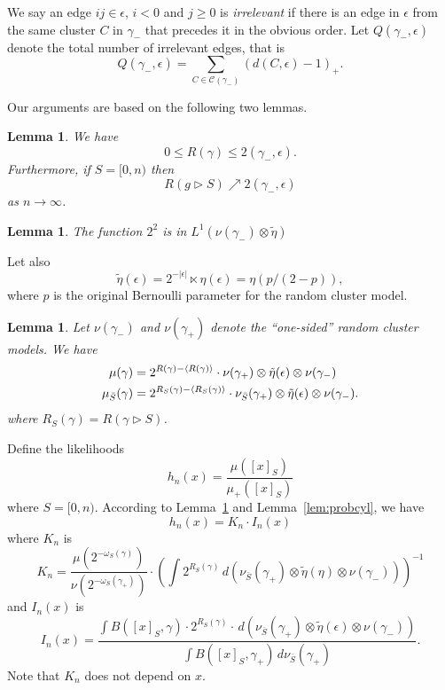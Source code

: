 \documentclass[11pt, a4paper]{amsart}
\newtheorem{lem}[thm]{Lemma}
\theoremstyle{definition}
\theoremstyle{remark}
\renewcommand{\d}{\,d}
\providecommand{\mscr}{\mathscr}
\providecommand{\ol}{\overline}
\providecommand{\e}{\epsilon}
\providecommand{\tl}{\tilde}
\providecommand{\g}{\gamma}
\providecommand{\w}{\omega}
\begin{document}
We say an edge $ij\in\e$, $i<0$ and $j\ge0$ is \emph{irrelevant} if there is an edge
in $\e$ from the same cluster $C$ in $\g_-$ that precedes it in the obvious
order. Let $Q(\g_-,\e)$ denote the total number of irrelevant edges, that is
\begin{equation}
Q(\g_-,\e) = \sum_{C\in\mscr C(\g_-)} \left(d(C,\epsilon)-1\right)_+.
\end{equation}

Our arguments are based on the following two lemmas.
\begin{lem}\label{lem:defQ}
We have
\begin{equation}
0\le R(\g) \le 2(\g_-,\e).
\end{equation}
Furthermore, if $S=[0,n)$ then
\begin{equation}
  \label{eq:RtoQ}
  R(g \triangleright S) \nearrow 2(\g_-,\e)
\end{equation}
as $n\to\infty$.
\end{lem}
\begin{lem}\label{lem:L1Q}
The function $2^2$ is in $L^1(\nu(\g_-)\otimes\tilde \eta)$
\end{lem}

Let also
$$ \tilde \eta(\epsilon)= 2^{-|\epsilon|} \ltimes \eta (\epsilon) = \eta(p/(2-p)), $$
where $p$ is the original Bernoulli parameter for the random cluster model.

\begin{lem}\label{lem:distributive}
  Let $\nu(\g_-)$ and $\nu(\g_+)$ denote the ``one-sided'' random cluster models. We
  have
\begin{align}
  \mu(\g) &= 2^{R(\g) - \cc{R(\g)}} \cdot \nu(\g_+) \otimes \tilde \eta(\e) \otimes \nu(\g_-) \\
  \mu_{\bar S}(\g) &= 2^{R_S(\g) - \cc{R_S(\g)}} \cdot \nu_{\bar S}(\g_+) \otimes \tilde \eta(\e) \otimes \nu(\g_-).
\end{align}
where $R_S(\g)=R(\g\triangleright S)$.
\end{lem}

Define the likelihoods
\begin{equation*}
  h_n(x) = \frac{\mu([x]_S)}{\mu_+([x]_S)}
\end{equation*}
where $S=[0,n)$. According to
Lemma~\ref{lem:distributive} and Lemma~\ref{lem:probcyl}, we have
\begin{equation}
  h_n(x) =
  K_n \cdot I_n(x)
\end{equation}
where $K_n$ is
\begin{equation}
  \label{eq:Kdef}
  K_n = \frac{\mu(2^{-\w_S(\g)})}{\nu(2^{-\w_S(\g_+)})} \cdot
  {\left(\int 2^{R_S(\g)} \d(\nu_{\bar S}(\g_+)\otimes \tl\eta(\eta) \otimes \nu(\g_-))\right)}^{-1}
\end{equation}
and $I_n(x)$ is
\begin{equation}
  \label{eq:I_n}
  I_n(x) =
  \frac{\int B([x]_S, \g) \cdot 2^{R_S(\g)} \cdot \d(\nu_{\ol S}(\g_+) \otimes\tilde \eta(\e)\otimes \nu(\g_-))}
  {\int B([x]_S,\g_+) \d\nu_{\bar S}(\g_+)}.
\end{equation}
Note that $K_n$ does not depend on $x$.
\end{document}

